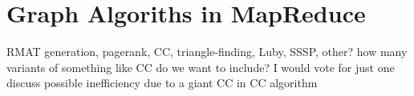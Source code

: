 \section{Graph Algoriths in MapReduce}
\label{sec:graph}

  RMAT generation, pagerank, CC, triangle-finding, Luby, SSSP, other?
  how many variants of something like CC do we want to include?
    I would vote for just one
  discuss possible inefficiency due to a giant CC in CC algorithm
